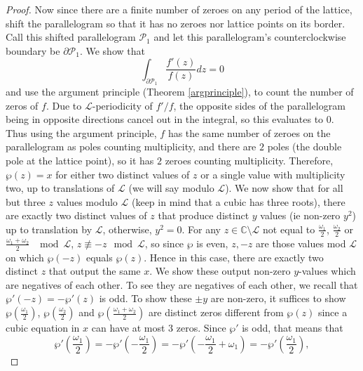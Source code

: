 \documentclass{article}
\theoremstyle{definition}
\theoremstyle{definition}
\theoremstyle{definition}
\begin{document}
\begin{proof}
\newline\newline
Now since there are a finite number of zeroes on any period of the lattice, shift the parallelogram so that it has no zeroes nor lattice points on its border. Call this shifted parallelogram $\mathcal{P}_1$ and let this parallelogram's counterclockwise boundary be $\partial \mathcal{P}_1$. We show that
$$\int_{\partial \mathcal{P}_1} \frac{f'(z)}{f(z)} dz=0$$
and use the argument principle (Theorem \ref{argprinciple}), to count the number of zeros of $f$.
\newline\newline
Due to $\mathcal L$-periodicity of $f'/f$, the opposite sides of the parallelogram being in opposite directions cancel out in the integral, so this evaluates to $0$. Thus using the argument principle, $f$ has the same number of zeroes on the parallelogram as poles counting multiplicity, and there are $2$ poles (the double pole at the lattice point), so it has $2$ zeroes counting multiplicity. Therefore, $\wp(z)=x$ for either two distinct values of $z$ or a single value with multiplicity two, up to translations of $\mathcal{L}$ (we will say modulo $\mathcal{L}$).
\newline\newline
We now show that for all but three $z$ values modulo $\mathcal{L}$ (keep in mind that a cubic has three roots), there are exactly two distinct values of $z$ that produce distinct $y$ values (ie non-zero $y^2$) up to translation by $\mathcal{L}$, otherwise, $y^2=0$.
\newline\newline
For any $z\in\mathbb C\setminus\mathcal L$ not equal to $\frac{\omega_1}2$, $\frac{\omega_2}2$ or $\frac{\omega_1+\omega_2}2$ $\mod\mathcal{L}$, $z\not\equiv-z\mod\mathcal L$, so since $\wp$ is even, $z,-z$ are those values mod $\mathcal{L}$ on which $\wp(-z)$ equals $\wp(z)$. Hence in this case, there are exactly two distinct $z$ that output the same $x$. We show these output non-zero $y$-values which are negatives of each other. To see they are negatives of each other, we recall that $\wp'(-z)=-\wp'(z)$ is odd. To show these $\pm y$ are non-zero, it suffices to show $\wp(\frac{\omega_1}2)$, $\wp(\frac{\omega_2}2)$ and $\wp(\frac{\omega_1+\omega_2}2)$ are distinct zeros different from $\wp(z)$ since a cubic equation in $x$ can have at most 3 zeros.
\newline\newline
Since $\wp'$ is odd, that means that $$\wp'(\frac{\omega_1}2)=-\wp'(-\frac{\omega_1}2)=-\wp'(-\frac{\omega_1}2+\omega_1)=-\wp'(\frac{\omega_1}2),$$

\end{proof}
\end{document}
